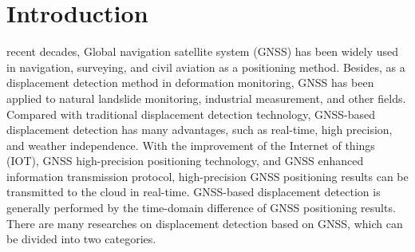 \documentclass[journal]{IEEEtran}
\begin{document}
	\section{Introduction}
	\label{intro}
	  recent decades, Global navigation satellite system (GNSS) has been widely used in navigation, surveying, and civil aviation as a positioning method\cite{teunissen2017springer}. 
	Besides, as a displacement detection method in deformation monitoring, GNSS has been applied to natural landslide monitoring\cite{awange2012environmental}, industrial measurement\cite{pavasovic2011application}, and other fields. 
	Compared with traditional displacement detection technology, GNSS-based displacement detection has many advantages, such as real-time, high precision, and weather independence\cite{shen2019a}. 
	With the improvement of the Internet of things (IOT), GNSS high-precision positioning technology, and GNSS enhanced information transmission protocol, high-precision GNSS positioning results can be transmitted to the cloud in real-time.
	GNSS-based displacement detection is generally performed by the time-domain difference of GNSS positioning results\cite{abidin2004use,rs12203375}. 
	There are many researches on displacement detection based on GNSS, which can be divided into two categories.
		
\end{document}
